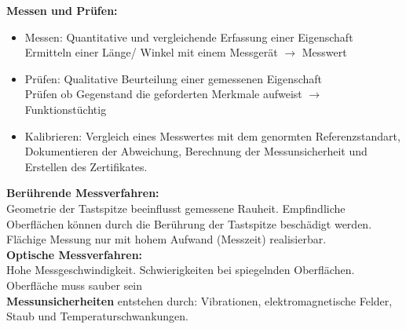 \textbf{Messen und Prüfen:}
\begin{itemize}
    \item Messen: Quantitative und vergleichende Erfassung einer Eigenschaft
    \\Ermitteln einer Länge/ Winkel mit einem Messgerät $\rightarrow$ Messwert
    \item Prüfen: Qualitative Beurteilung einer gemessenen Eigenschaft
    \\Prüfen ob Gegenstand die geforderten Merkmale aufweist $\rightarrow$ Funktionstüchtig
    \item Kalibrieren: Vergleich eines Messwertes mit dem genormten Referenzstandart,
    Dokumentieren der Abweichung, Berechnung der Messunsicherheit und Erstellen des Zertifikates.
\end{itemize}
\hspace{0.05\linewidth}

\textbf{Berührende Messverfahren:}\\
Geometrie der Tastspitze beeinflusst 
gemessene Rauheit. Empfindliche Oberflächen können durch die Berührung der Tastspitze 
beschädigt werden. Flächige Messung nur mit hohem Aufwand 
(Messzeit) realisierbar.\\

\textbf{Optische Messverfahren:}\\
Hohe Messgeschwindigkeit. Schwierigkeiten bei spiegelnden 
Oberflächen. Oberfläche muss sauber sein\\

\textbf{Messunsicherheiten} entstehen durch: Vibrationen, elektromagnetische 
Felder, Staub und Temperaturschwankungen.

